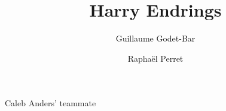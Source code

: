 \documentclass{rpg_non_player_character}
\title{Harry Endrings}
\begin{document}
\author{Guillaume Godet-Bar \and Rapha\"el Perret}
\maketitle

Caleb Anders' teammate 
\end{document}
